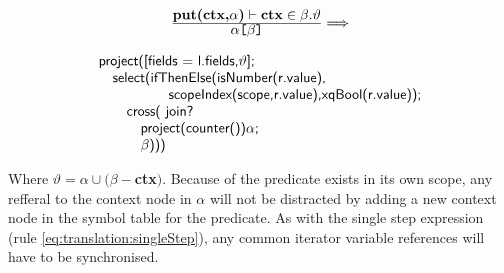 \begin{equation}
\centering
\begin{array}{c}
	\frac{\displaystyle \textbf{put(ctx,}\alpha\textbf{)}\vdash\textbf{ctx}\in\beta.\vartheta}
	{\displaystyle \alpha\texttt{[}\beta\texttt{]}}

	\Longrightarrow 
	\\
	\mbox{}
	\\
	\begin{array}{l}
		\mbox{\textsf{project([fields = l.fields,}} \vartheta \mbox{\textsf{];}} 
		\\ \quad \mbox{\textsf{select(ifThenElse(isNumber(r.value),}} \\ \quad 
		\qquad\qquad \mbox{\textsf{scopeIndex(scope,r.value),xqBool(r.value));}} \\ \quad\quad
		\mbox{\textsf{cross( join?}} \\ \quad\quad\quad
		\mbox{\textsf{project(counter())}}\alpha \textsf{;} \\ \quad\quad\quad
		\beta \mbox{\textsf{)))}}
	\end{array}
\end{array}
\label{eq:translation:iterationPredicate}
\end{equation}

Where $\vartheta = \alpha \cup (\beta -$\textbf{ctx}$)$. Because of the predicate exists in its own scope, any
refferal to the context node in $\alpha$ will not be distracted by adding a new context node in the symbol table
for the predicate. As with the single step expression (rule \ref{eq:translation:singleStep}), any common iterator
variable references will have to be synchronised.




